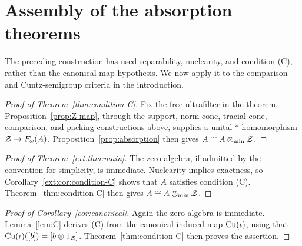 \section{Assembly of the absorption theorems}
\label{sec:assembly}

The preceding construction has used separability, nuclearity, and
condition (C), rather than the canonical-map hypothesis. We now apply
it to the comparison and Cuntz-semigroup criteria in the introduction.

\begin{proof}[Proof of Theorem~\ref{thm:condition-C}]
Fix the free ultrafilter in the theorem.
Proposition~\ref{prop:Z-map}, through the support, norm-cone,
tracial-cone, comparison, and packing constructions above, supplies
a unital $*$-homomorphism $\mathcal Z\to F_\omega(A)$.
Proposition~\ref{prop:absorption} then gives
$A\cong A\otimes_{\min}\mathcal Z$.
\end{proof}

\begin{proof}[Proof of Theorem~\ref{ext:thm:main}]
The zero algebra, if admitted by the convention for simplicity, is
immediate. Nuclearity implies exactness, so
Corollary~\ref{ext:cor:condition-C} shows that $A$ satisfies
condition \textup{(C)}. Theorem~\ref{thm:condition-C} then gives
$A\cong A\otimes_{\min}\mathcal Z$.
\end{proof}

\begin{proof}[Proof of Corollary~\ref{cor:canonical}]
Again the zero algebra is immediate. Lemma~\ref{lem:C} derives
(C) from the canonical induced map $\mathrm{Cu}(\iota)$, using that
$\mathrm{Cu}(\iota)([b])=[b\otimes1_\mathcal Z]$. Theorem~\ref{thm:condition-C}
then proves the assertion.
\end{proof}


